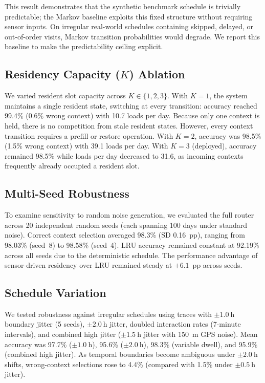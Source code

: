 \documentclass[conference]{IEEEtran}
\begin{document}
This result demonstrates that the synthetic benchmark schedule is trivially predictable; the Markov baseline exploits this fixed structure without requiring sensor inputs. On irregular real-world schedules containing skipped, delayed, or out-of-order visits, Markov transition probabilities would degrade. We report this baseline to make the predictability ceiling explicit.

\subsection{Residency Capacity (\texorpdfstring{$K$}{K}) Ablation}
\label{sec:eval_k_ablation}
We varied resident slot capacity across $K \in \{1, 2, 3\}$. With $K=1$, the system maintains a single resident state, switching at every transition: accuracy reached 99.4\% (0.6\% wrong context) with 10.7 loads per day. Because only one context is held, there is no competition from stale resident states. However, every context transition requires a prefill or restore operation. With $K=2$, accuracy was 98.5\% (1.5\% wrong context) with 39.1 loads per day. With $K=3$ (deployed), accuracy remained 98.5\% while loads per day decreased to 31.6, as incoming contexts frequently already occupied a resident slot.

\subsection{Multi-Seed Robustness}
\label{sec:eval_multiseed}
To examine sensitivity to random noise generation, we evaluated the full router across 20 independent random seeds (each spanning 100 days under standard noise). Correct context selection averaged 98.3\% (SD 0.16~pp), ranging from 98.03\% (seed~8) to 98.58\% (seed~4). LRU accuracy remained constant at 92.19\% across all seeds due to the deterministic schedule. The performance advantage of sensor-driven residency over LRU remained steady at $+6.1$~pp across seeds.

\subsection{Schedule Variation}
\label{sec:eval_independent}
We tested robustness against irregular schedules using traces with $\pm 1.0~\mathrm{h}$ boundary jitter (5 seeds), $\pm 2.0~\mathrm{h}$ jitter, doubled interaction rates (7-minute intervals), and combined high jitter ($\pm 1.5~\mathrm{h}$ jitter with 150~m GPS noise). Mean accuracy was 97.7\% ($\pm 1.0~\mathrm{h}$), 95.6\% ($\pm 2.0~\mathrm{h}$), 98.3\% (variable dwell), and 95.9\% (combined high jitter). As temporal boundaries become ambiguous under $\pm 2.0~\mathrm{h}$ shifts, wrong-context selections rose to 4.4\% (compared with 1.5\% under $\pm 0.5~\mathrm{h}$ jitter).
\end{document}
